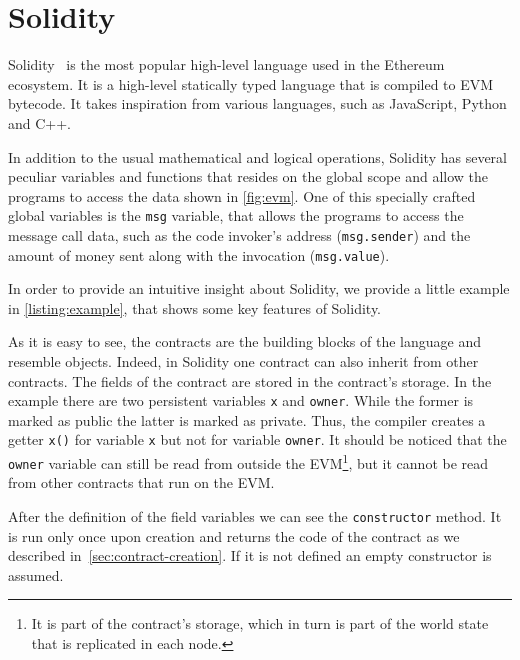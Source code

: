 \section{Solidity}
\label{sec:solidity}
Solidity~\cite{bib:solidity-docs} is the most popular
high-level language used in the Ethereum ecosystem.
It is a high-level statically typed language that is compiled to EVM bytecode.
It takes inspiration from various languages, such as JavaScript, Python and C++.

In addition to the usual mathematical and logical operations, Solidity has
several peculiar variables and functions that resides on the global scope and
allow the programs to access the data shown in \autoref{fig:evm}.
One of this specially crafted global variables is the \texttt{msg} variable,
that allows the programs to access the message call data,
such as the code invoker's address (\texttt{msg.sender}) and the amount of
money sent along with the invocation (\texttt{msg.value}).

In order to provide an intuitive insight about Solidity, we provide a little
example in \autoref{listing:example}, that shows some key features of Solidity.

\begin{figure}[!h]

\end{figure}

As it is easy to see, the contracts are the building blocks of the language and
resemble objects. Indeed, in Solidity one contract can also inherit from other
contracts.
The fields of the contract are stored in the contract's storage. In the example
there are two persistent variables \verb|x| and \verb|owner|. While the former
is marked as public the latter is marked as private. Thus, the compiler
creates a getter \verb|x()| for variable \verb|x| but not for variable
\verb|owner|. It should be noticed that the \verb|owner| variable can still
be read from outside the EVM\footnote{It is part of the contract's storage,
which in turn is part of the world state that is replicated in each node.},
but it cannot be read from other contracts that run on the EVM.


After the definition of the field variables we can see the \texttt{constructor}
method. It is run only once upon creation and returns the code of the contract
as we described in~\autoref{sec:contract-creation}. If it is not defined
an empty constructor is assumed.

